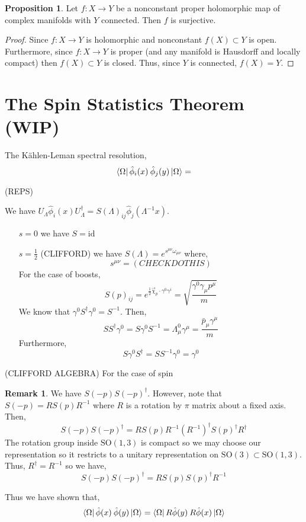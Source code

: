 \documentclass[12pt]{extarticle}
\newcommand{\id}{\mathrm{id}}
\theoremstyle{definition}
\newtheorem{proposition}[theorem]{Proposition}
\newtheorem{remark}{Remark}
\begin{document}
\begin{proposition}
Let $f : X \to Y$ be a nonconstant proper holomorphic map of complex manifolds with $Y$ connected. Then $f$ is surjective. 
\end{proposition}

\begin{proof}
Since $f : X \to Y$ is holomorphic and nonconstant $f(X) \subset Y$ is open. Furthermore, since $f : X \to Y$ is proper (and any manifold is Hausdorff and locally compact) then $f(X) \subset Y$ is closed. Thus, since $Y$ is connected, $f(X) = Y$. 
\end{proof}

\section{The Spin Statistics Theorem (WIP)}

The K\"{a}hlen-Leman spectral resolution,
\[ \left< \Omega \right| \hat{\phi}_i(x) \: \hat{\phi}_j(y) \left| \Omega \right> = \]

(REPS)

We have $U_\Lambda \hat{\phi}_i(x) U^\dagger_\Lambda = S(\Lambda)_{ij} \hat{\phi}_j(\Lambda^{-1} x)$.
\begin{enumerate}
\item[$s = 0$] we have $S = \id$
\item[$s = \tfrac{1}{2}$] (CLIFFORD) we have $S(\Lambda) = e^{s^{\mu \nu} \omega_{\mu \nu}}$ where,
\[ s^{\mu \nu} = (CHECK DO THIS) \] 
For the case of boosts,
\[ S(p)_{ij} = e^{\tfrac{1}{2} \vec{\chi}_p \cdot \gamma^0 \gamma^i} = \sqrt{\frac{\gamma^0 \gamma_\mu p^\mu}{m}} \]
We know that $\gamma^0 S^\dagger \gamma^0 = S^{-1}$. 
Then,
\[ S S^\dagger \gamma^0 = S \gamma^0 S^{-1} = \Lambda^{0}_\mu \gamma^\mu = \frac{\bar{p}_\mu \gamma^\mu}{m} \]
Furthermore,
\[ S \gamma^0 S^\dagger = S S^{-1} \gamma^0 = \gamma^0 \]
\end{enumerate}

(CLIFFORD ALGEBRA)
For the case of spin 


\begin{remark}
We have $S(-p) S(-p)^\dagger$. However, note that $S(-p) = R S(p) R^{-1}$ where $R$ is  a rotation by $\pi$ matrix about a fixed axis. Then,
\[ S(-p) S(-p)^\dagger = R S(p) R^{-1} (R^{-1})^\dagger S(p)^\dagger R^\dagger \]
The rotation group inside $\mathrm{SO}(1,3)$ is compact so we may choose our representation so it restricts to a unitary representation on $\mathrm{SO}(3) \subset \mathrm{SO}(1,3)$. Thus, $R^\dagger = R^{-1}$ so we have,
\[ S(-p) S(-p)^\dagger = R S(p) S(p)^\dagger R^{-1} \]
\end{remark}
Thus we have shown that,
\[ \left< \Omega \right| \hat{\phi}(x) \: \hat{\phi}(y) \left| \Omega \right> = \left< \Omega \right| R \hat{\phi}(y) \: R \hat{\phi}(x)  \left| \Omega \right> \]
\end{document}
